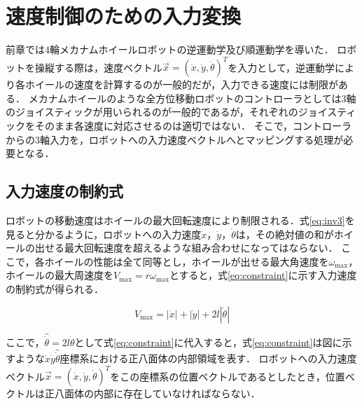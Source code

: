 \documentclass[../master]{subfiles}
\begin{document}
  \section{速度制御のための入力変換}

  前章では4輪メカナムホイールロボットの逆運動学及び順運動学を導いた．
  ロボットを操縦する際は，速度ベクトル$\vec{x} = (\dot{x}, \dot{y}, \dot{\theta})^T$を入力として，逆運動学により各ホイールの速度を計算するのが一般的だが，入力できる速度には制限がある．
  メカナムホイールのような全方位移動ロボットのコントローラとしては3軸のジョイスティックが用いられるのが一般的であるが，それぞれのジョイスティックをそのまま各速度に対応させるのは適切ではない．
  そこで，コントローラからの3軸入力を，ロボットへの入力速度ベクトルへとマッピングする処理が必要となる．

  \subsection{入力速度の制約式}

  ロボットの移動速度はホイールの最大回転速度により制限される．式\ref{eq:inv3}を見ると分かるように，ロボットへの入力速度$\dot{x}$，$\dot{y}$，$\dot{\theta}$は，その絶対値の和がホイールの出せる最大回転速度を超えるような組み合わせになってはならない．
  ここで，各ホイールの性能は全て同等とし，ホイールが出せる最大角速度を$\omega_{\text{max}}$，ホイールの最大周速度を$V_{\text{max}} = r \omega_{\text{max}}$とすると，式\ref{eq:constraint}に示す入力速度の制約式が得られる．

  \begin{equation}
    V_{\text{max}} = |\dot{x}| + |\dot{y}| + 2l|\dot{\theta}|
    \label{eq:constraint}
  \end{equation}

  ここで，$\hat{\dot{\theta}} = 2l\dot{\theta}$として式\ref{eq:constraint}に代入すると，式\ref{eq:constraint}は図に示すような$\dot{x}\dot{y}\hat{\dot{\theta}}$座標系における正八面体の内部領域を表す．
  ロボットへの入力速度ベクトル$\vec{x} = (\dot{x}, \dot{y}, \dot{\theta})^T$をこの座標系の位置ベクトルであるとしたとき，位置ベクトルは正八面体の内部に存在していなければならない．
\end{document}

